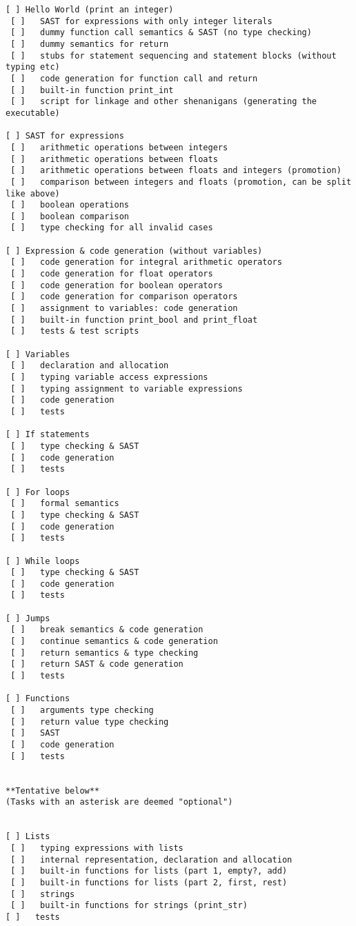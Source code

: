\begin{verbatim}
[ ] Hello World (print an integer)
 [ ]   SAST for expressions with only integer literals
 [ ]   dummy function call semantics & SAST (no type checking)
 [ ]   dummy semantics for return
 [ ]   stubs for statement sequencing and statement blocks (without typing etc)
 [ ]   code generation for function call and return
 [ ]   built-in function print_int
 [ ]   script for linkage and other shenanigans (generating the executable)

[ ] SAST for expressions
 [ ]   arithmetic operations between integers
 [ ]   arithmetic operations between floats
 [ ]   arithmetic operations between floats and integers (promotion)
 [ ]   comparison between integers and floats (promotion, can be split like above)
 [ ]   boolean operations
 [ ]   boolean comparison
 [ ]   type checking for all invalid cases

[ ] Expression & code generation (without variables)
 [ ]   code generation for integral arithmetic operators
 [ ]   code generation for float operators
 [ ]   code generation for boolean operators
 [ ]   code generation for comparison operators
 [ ]   assignment to variables: code generation
 [ ]   built-in function print_bool and print_float
 [ ]   tests & test scripts

[ ] Variables
 [ ]   declaration and allocation
 [ ]   typing variable access expressions
 [ ]   typing assignment to variable expressions
 [ ]   code generation
 [ ]   tests

[ ] If statements
 [ ]   type checking & SAST
 [ ]   code generation
 [ ]   tests

[ ] For loops
 [ ]   formal semantics
 [ ]   type checking & SAST
 [ ]   code generation
 [ ]   tests

[ ] While loops
 [ ]   type checking & SAST
 [ ]   code generation
 [ ]   tests

[ ] Jumps
 [ ]   break semantics & code generation
 [ ]   continue semantics & code generation
 [ ]   return semantics & type checking
 [ ]   return SAST & code generation
 [ ]   tests

[ ] Functions
 [ ]   arguments type checking
 [ ]   return value type checking
 [ ]   SAST
 [ ]   code generation
 [ ]   tests


**Tentative below**
(Tasks with an asterisk are deemed "optional")


[ ] Lists
 [ ]   typing expressions with lists
 [ ]   internal representation, declaration and allocation
 [ ]   built-in functions for lists (part 1, empty?, add)
 [ ]   built-in functions for lists (part 2, first, rest)
 [ ]   strings
 [ ]   built-in functions for strings (print_str)
[ ]   tests


\end{verbatim}
